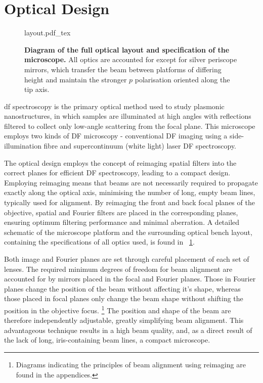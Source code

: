 \documentclass{article}
\begin{document}
\section{Optical Design}
\label{sec:optical_design}

\begin{figure}[p]
\centering
\fontsize{9.5pt}{1em}\selectfont
\def\svgwidth{0.93\textwidth}
{layout.pdf_tex}
\caption[Diagram of the full optical layout]{\textbf{Diagram of the full optical layout and specification of the microscope.} All optics are accounted for except for silver periscope mirrors, which transfer the beam between platforms of differing height and maintain the stronger $p$ polarisation oriented along the tip axis.}
\label{fig:layout}
\end{figure}

\Gls{df} spectroscopy is the primary optical method used to study plasmonic nanostructures, in which samples are illuminated at high angles with reflections filtered to collect only low-angle scattering from the focal plane. This microscope employs two kinds of DF microscopy - conventional DF imaging using a side-illumination fibre and supercontinuum (white light) laser DF spectroscopy.

The optical design employs the concept of reimaging spatial filters into the correct planes for efficient DF spectroscopy, leading to a compact design. Employing reimaging means that beams are not necessarily required to propagate exactly along the optical axis, minimising the number of long, empty beam lines, typically used for alignment. By reimaging the front and back focal planes of the objective, spatial and Fourier filters are placed in the corresponding planes, ensuring optimum filtering performance and minimal aberration. A detailed schematic of the microscope platform and the surrounding optical bench layout, containing the specifications of all optics used, is found in \figurename~\ref{fig:layout}.

Both image and Fourier planes are set through careful placement of each set of lenses. The required minimum degrees of freedom for beam alignment are accounted for by mirrors placed in the focal and Fourier planes. Those in Fourier planes change the position of the beam without affecting it's shape, whereas those placed in focal planes only change the beam shape without shifting the position in the objective focus.%
\footnote{Diagrams indicating the principles of beam alignment using reimaging are found in the appendices.}
The position and shape of the beam are therefore independently adjustable, greatly simplifying beam alignment. This advantageous technique results in a high beam quality, and, as a direct result of the lack of long, iris-containing beam lines, a compact microscope.
\end{document}
